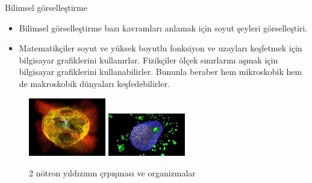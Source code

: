 \documentclass{beamer}
\begin{document}
\begin{frame}{Bilimsel görselleştirme}
\begin{itemize}
     \item Bilimsel görselleştirme bazı kavramları anlamak için soyut şeyleri görselleştiri.
    \item Matematikçiler soyut ve yüksek
boyutlu fonksiyon ve uzayları keşfetmek için bilgisayar grafiklerini kullanırlar.
Fizikçiler ölçek sınırlarını aşmak için bilgisayar grafiklerini kullanabilirler.
Bununla beraber hem mikroskobik hem de makroskobik dünyaları
keşfedebilirler.\cite{bilimselgorsellestirme}
   

\end{itemize}
\begin{figure}
\includegraphics[width=0.3\textwidth]{görselleştirme.PNG}
\includegraphics[width=0.3\textwidth]{bilimselgörsel.PNG}
\caption{2 nötron yıldızının çrpışması ve organizmalar}



\end{figure}

    
\end{frame}
\end{document}
